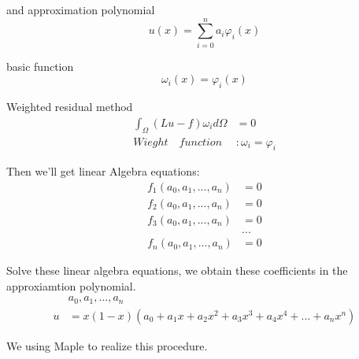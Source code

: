 \documentclass{article}%
\begin{document}
and approximation polynomial%
\[
u\left(  x\right)  =%
{\displaystyle\sum\limits_{i=0}^{n}}
a_{i}\varphi_{i}\left(  x\right)
\]


basic function%
\[
\omega_{i}\left(  x\right)  =\varphi_{i}\left(  x\right)
\]


Weighted residual method%
\begin{align*}
\int_{\Omega}\left(  Lu-f\right)  \omega_{i}d\Omega &  =0\\
Wieght\quad function  &  :\omega_{i}=\varphi_{i}%
\end{align*}


Then we'll get linear Algebra equations:%
\begin{align*}
f_{1}\left(  a_{0},a_{1},...,a_{n}\right)   &  =0\\
f_{2}\left(  a_{0},a_{1},...,a_{n}\right)   &  =0\\
f_{3}\left(  a_{0},a_{1},...,a_{n}\right)   &  =0\\
&  ...\\
f_{n}\left(  a_{0},a_{1},...,a_{n}\right)   &  =0
\end{align*}


Solve these linear algebra equations, we obtain these coefficients in the
approxiamtion polynomial.%
\begin{align*}
&  a_{0},a_{1},...,a_{n}\\
u  &  =x\left(  1-x\right)  \left(  a_{0}+a_{1}x+a_{2}x^{2}+a_{3}x^{3}%
+a_{4}x^{4}+...+a_{n}x^{n}\right)
\end{align*}


We using Maple to realize this procedure.
\end{document}

